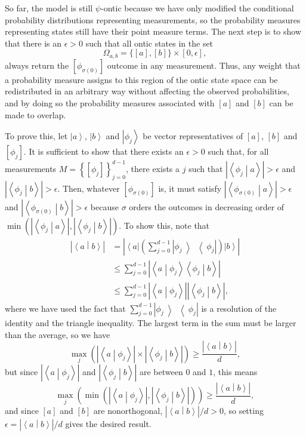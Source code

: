 \documentclass[DIV=calc,paper=a4,fontsize=11pt,twocolumn]{scrartcl} %
\theoremstyle{definition}
\theoremstyle{plain}
\newcommand{\Ket}[1]{\ensuremath{\left \vert #1 \right \rangle}}
\newcommand{\Bra}[1]{\ensuremath{\left \langle #1 \right \vert}}
\newcommand{\BraKet}[2]{\ensuremath{\left \langle #1 \middle \vert #2
\right \rangle}}
\newcommand{\KetBra}[2]{\ensuremath{\left \vert #1 \middle \rangle
\middle \langle #2 \right \vert}}
\newcommand{\Proj}[1]{\ensuremath{\left [ #1 \right ]}}
\begin{document}
So far, the model is still $\psi$-ontic because we have only modified
the conditional probability distributions representing measurements,
so the probability measures representing states still have their point
measure terms.  The next step is to show that there is an $\epsilon >
0$ such that all ontic states in the set
\begin{equation}
\Omega_{a,b} = \{\Proj{a},\Proj{b}\} \times [0,\epsilon],
\end{equation}
always return the $\Proj{\phi_{\sigma(0)}}$ outcome in any
measurement.  Thus, any weight that a probability measure assigns to
this region of the ontic state space can be redistributed in an
arbitrary way without affecting the observed probabilities, and by
doing so the probability measures associated with $\Proj{a}$ and
$\Proj{b}$ can be made to overlap.

To prove this, let $\Ket{a}$, $\Ket{b}$ and $\Ket{\phi_j}$ be vector
representatives of $\Proj{a}$, $\Proj{b}$ and $\Proj{\phi_j}$.  It is
sufficient to show that there exists an $\epsilon > 0$ such that, for
all measurements $M = \left \{ \Proj{\phi_j}\right \}_{j=0}^{d-1}$, there
exists a $j$ such that $\left | \BraKet{\phi_j}{a}\right | > \epsilon$
and $\left | \BraKet{\phi_j}{b}\right | > \epsilon$.  Then, whatever
$\Proj{\phi_{\sigma(0)}}$ is, it must satisfy $\left |
\BraKet{\phi_{\sigma(0)}}{a}\right | > \epsilon$ and $\left |
\BraKet{\phi_{\sigma(0)}}{b}\right | > \epsilon$ because $\sigma$
orders the outcomes in decreasing order of $\min \left ( \left |
\BraKet{\phi_j}{a}\right |, \left | \BraKet{\phi_j}{b}\right |
\right )$.  To show this, note that
\begin{align}
\left | \BraKet{a}{b} \right | & = \left |
\Bra{a} \left ( \sum_{j=0}^{d-1} \KetBra{\phi_j}{\phi_j} \right )
\Ket{b} \right | \\
& \leq \sum_{j=0}^{d-1} \left | \BraKet{a}{\phi_j}\BraKet{\phi_j}{b}
\right | \\
& \leq \sum_{j=0}^{d-1} \left | \BraKet{a}{\phi_j} \right | \left |
\BraKet{\phi_j}{b} \right |,
\end{align}
where we have used the fact that $\sum_{j=0}^{d-1}
\KetBra{\phi_j}{\phi_j}$ is a resolution of the identity and the
triangle inequality.  The largest term in the sum must be larger than
the average, so we have
\begin{equation}
\max_j  \left ( \left | \BraKet{a}{\phi_j} \right | \times \left |
\BraKet{\phi_j}{b} \right |\right ) \geq \frac{\left | \BraKet{a}{b}
\right |}{d},
\end{equation}
but since $\left | \BraKet{a}{\phi_j} \right |$ and $\left |
\BraKet{\phi_j}{b} \right |$ are between $0$ and $1$, this means
\begin{equation}
\max_j  \left ( \min \left ( \left | \BraKet{a}{\phi_j} \right |, \left |
\BraKet{\phi_j}{b} \right | \right ) \right ) \geq \frac{\left |
\BraKet{a}{b} \right |}{d},
\end{equation}
and since $\Proj{a}$ and $\Proj{b}$ are nonorthogonal, $\left |
\BraKet{a}{b} \right |/d > 0$, so setting $\epsilon = \left |
\BraKet{a}{b} \right |/d$ gives the desired result.
\end{document}

